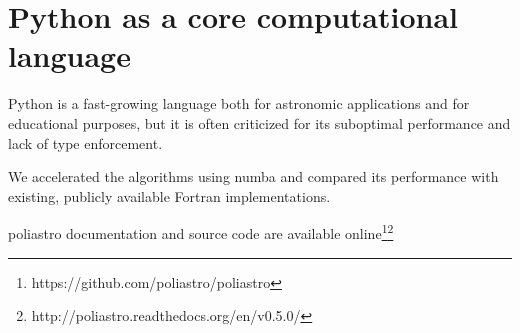 \section{Python as a core computational language}
\label{sec:python}

Python is a fast-growing language both for astronomic applications\cite{2015arXiv150703989M} and for educational purposes\cite{guo2014python}, but it is often criticized for its suboptimal performance and lack of type enforcement.

We accelerated the algorithms using numba and compared its performance with existing, publicly available Fortran implementations.

poliastro documentation and source code are available online\footnote{https://github.com/poliastro/poliastro}\footnote{http://poliastro.readthedocs.org/en/v0.5.0/}